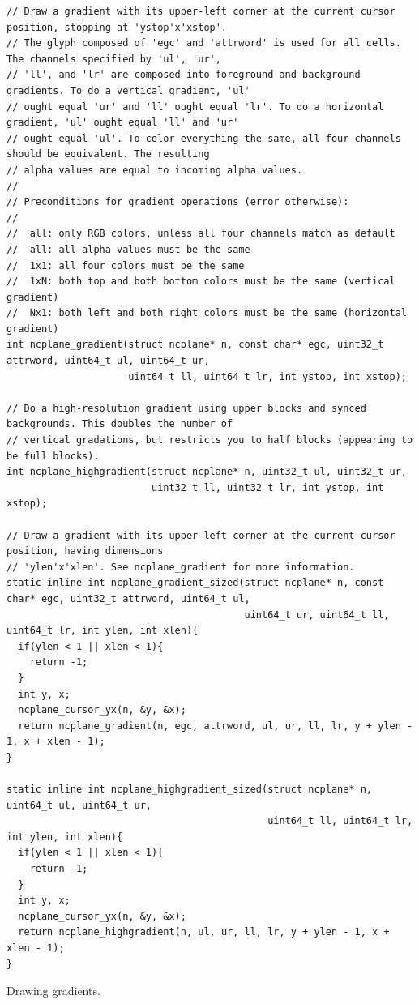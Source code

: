 \documentclass[letterpaper,10pt]{article}
\begin{document}
\begin{listing}[!htb]
\begin{verbatim}
// Draw a gradient with its upper-left corner at the current cursor position, stopping at 'ystop'x'xstop'.
// The glyph composed of 'egc' and 'attrword' is used for all cells. The channels specified by 'ul', 'ur',
// 'll', and 'lr' are composed into foreground and background gradients. To do a vertical gradient, 'ul'
// ought equal 'ur' and 'll' ought equal 'lr'. To do a horizontal gradient, 'ul' ought equal 'll' and 'ur'
// ought equal 'ul'. To color everything the same, all four channels should be equivalent. The resulting
// alpha values are equal to incoming alpha values.
//
// Preconditions for gradient operations (error otherwise):
//
//  all: only RGB colors, unless all four channels match as default
//  all: all alpha values must be the same
//  1x1: all four colors must be the same
//  1xN: both top and both bottom colors must be the same (vertical gradient)
//  Nx1: both left and both right colors must be the same (horizontal gradient)
int ncplane_gradient(struct ncplane* n, const char* egc, uint32_t attrword, uint64_t ul, uint64_t ur,
                     uint64_t ll, uint64_t lr, int ystop, int xstop);

// Do a high-resolution gradient using upper blocks and synced backgrounds. This doubles the number of
// vertical gradations, but restricts you to half blocks (appearing to be full blocks).
int ncplane_highgradient(struct ncplane* n, uint32_t ul, uint32_t ur,
                         uint32_t ll, uint32_t lr, int ystop, int xstop);

// Draw a gradient with its upper-left corner at the current cursor position, having dimensions
// 'ylen'x'xlen'. See ncplane_gradient for more information.
static inline int ncplane_gradient_sized(struct ncplane* n, const char* egc, uint32_t attrword, uint64_t ul,
                                         uint64_t ur, uint64_t ll, uint64_t lr, int ylen, int xlen){
  if(ylen < 1 || xlen < 1){
    return -1;
  }
  int y, x;
  ncplane_cursor_yx(n, &y, &x);
  return ncplane_gradient(n, egc, attrword, ul, ur, ll, lr, y + ylen - 1, x + xlen - 1);
}

static inline int ncplane_highgradient_sized(struct ncplane* n, uint64_t ul, uint64_t ur,
                                             uint64_t ll, uint64_t lr, int ylen, int xlen){
  if(ylen < 1 || xlen < 1){
    return -1;
  }
  int y, x;
  ncplane_cursor_yx(n, &y, &x);
  return ncplane_highgradient(n, ul, ur, ll, lr, y + ylen - 1, x + xlen - 1);
}
\end{verbatim}
\caption{Drawing gradients.}
\label{list:gradients}
\end{listing}
\end{document}
